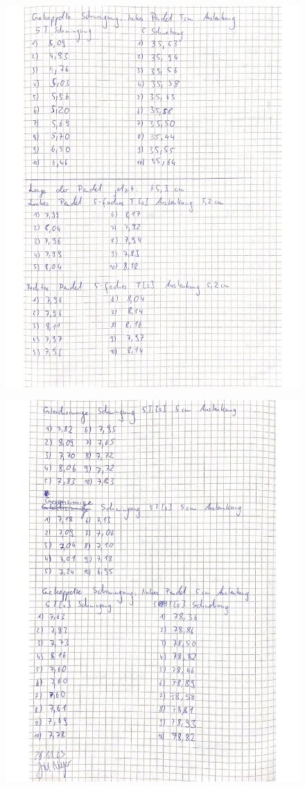  \begin{figure}[H]
   \centering
   \includegraphics[width=\textwidth]{Messwerte02.pdf}
   \label{fig:Messungen_2}
 \end{figure}
 
 \begin{figure}[H]
   \centering
   \includegraphics[width=\textwidth]{Messwerte03.pdf}
   \label{fig:Messungen_3}
 \end{figure}